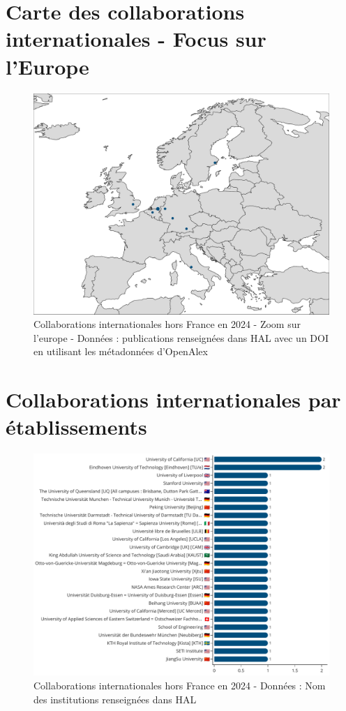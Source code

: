 \documentclass[french, 11pt]{../../dibiso/biso}
\begin{document}
\pagebreak

\section{Carte des collaborations internationales - Focus sur l’Europe}

\begin{figure}[!h]
  \includegraphics[width=\textwidth]{figures/collaborations_map_europe.pdf}
  \caption{Collaborations internationales hors France en 2024 - Zoom sur l'europe - Données : publications renseignées dans HAL avec un DOI en utilisant les métadonnées d'OpenAlex}
  \label{fig_collab_map_europe}
\end{figure}

\pagebreak

\section{Collaborations internationales par établissements}

\begin{figure}[!h]
  \includegraphics[width=\textwidth]{figures/international_collaborations.pdf}
  \caption{Collaborations internationales hors France en 2024 - Données : Nom des institutions renseignées dans HAL}
  \label{fig_collab_names}
\end{figure}
\end{document}
